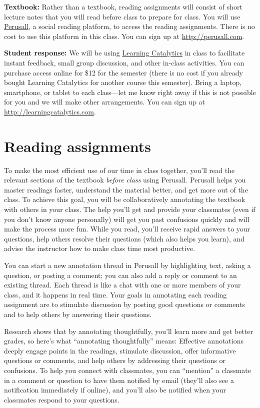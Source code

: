 \documentclass[12pt]{article}
\begin{document}
\textbf{Textbook:} Rather than a textbook, reading assignments will consist of short lecture notes that you will read before class to prepare for class.  You will use \href{http://perusall.com}{Perusall}, a social reading platform, to access the reading assignments. There is no cost to use this platform in this class. You can sign up at \url{http://perusall.com}.

\textbf{Student response:} We will be using \href{http://learningcatalytics.com}{Learning Catalytics} in class to facilitate instant feedback, small group discussion, and other in-class activities.  You can purchase access online for \$12 for the semester (there is no cost if you already bought Learning Catalytics for another course this semester).  Bring a laptop, smartphone, or tablet to each class---let me know right away if this is not possible for you and we will make other arrangements. You can sign up at \url{http://learningcatalytics.com}.

\section*{Reading assignments}

To make the most efficient use of our time in class together, you'll read the relevant sections of the textbook \emph{before class} using Perusall. 
Perusall helps you master readings faster, understand the material better, and get more out of the class. To achieve this goal, you will be collaboratively annotating the textbook with others in your class. The help you'll get and provide your classmates (even if you don't know anyone personally) will get you past confusions quickly and will make the process more fun. While you read, you'll receive rapid answers to your questions, help others resolve their questions (which also helps you learn), and advise the instructor how to make class time most productive. 

You can start a new annotation thread in Perusall by highlighting text, asking a question, or posting a comment; you can also add a reply or comment to an existing thread. Each thread is like a chat with one or more members of your class, and it happens in real time. Your goals in annotating each reading assignment are to stimulate discussion by posting good questions or comments and to help others by answering their questions.

Research shows that by annotating thoughtfully, you’ll learn more and get better grades, so here’s what ``annotating thoughtfully'' means: Effective annotations deeply engage points in the readings, stimulate discussion, offer informative questions or comments, and help others by addressing their questions or confusions. To help you connect with classmates, you can ``mention'' a classmate in a comment or question to have them notified by email (they’ll also see a notification immediately if online), and you’ll also be notified when your classmates respond to your questions. 
\end{document}
